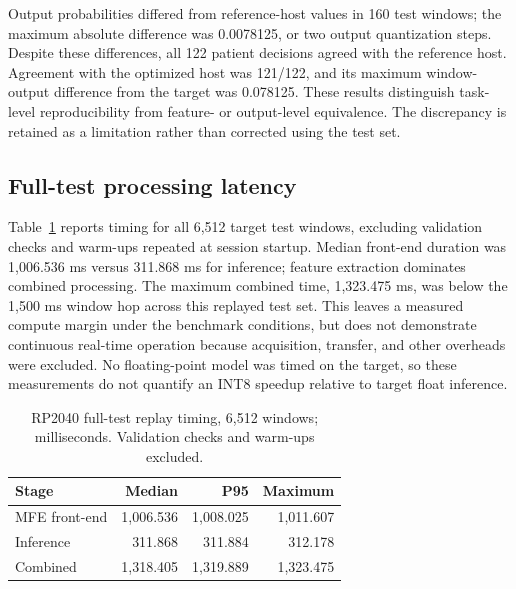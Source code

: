 \documentclass[9pt,twocolumn,twoside,lineno]{MSBJournal}
\begin{document}
Output probabilities differed from reference-host values in 160 test windows; the maximum absolute difference was 0.0078125, or two output quantization steps. Despite these differences, all 122 patient decisions agreed with the reference host. Agreement with the optimized host was 121/122, and its maximum window-output difference from the target was 0.078125. These results distinguish task-level reproducibility from feature- or output-level equivalence. The discrepancy is retained as a limitation rather than corrected using the test set.

\subsection{Full-test processing latency}

Table~\ref{tab:timing} reports timing for all 6,512 target test windows, excluding validation checks and warm-ups repeated at session startup. Median front-end duration was 1,006.536 ms versus 311.868 ms for inference; feature extraction dominates combined processing. The maximum combined time, 1,323.475 ms, was below the 1,500 ms window hop across this replayed test set. This leaves a measured compute margin under the benchmark conditions, but does not demonstrate continuous real-time operation because acquisition, transfer, and other overheads were excluded. No floating-point model was timed on the target, so these measurements do not quantify an INT8 speedup relative to target float inference.
\begin{table}[t]
\centering
\caption{RP2040 full-test replay timing, 6,512 windows; milliseconds. Validation checks and warm-ups excluded.}
\label{tab:timing}
\setlength{\tabcolsep}{4pt}
\begin{tabular}{lrrr}
\toprule
Stage & Median & P95 & Maximum\\
\midrule
MFE front-end & 1,006.536 & 1,008.025 & 1,011.607\\
Inference & 311.868 & 311.884 & 312.178\\
Combined & 1,318.405 & 1,319.889 & 1,323.475\\
\bottomrule
\end{tabular}
\end{table}
\end{document}
